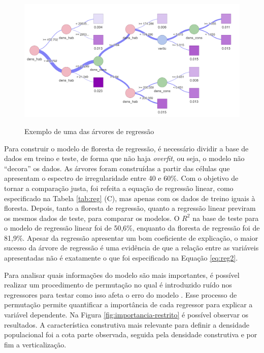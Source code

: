 \begin{figure}[h]
    \centering
    \caption{Exemplo de uma das árvores de regressão}
    \includegraphics[width = \linewidth]{imagens/tree_example.png}
    \label{fig:tree}
\end{figure}

Para construir o modelo de floresta de regressão, é necessário dividir a base de dados em treino e teste, de forma que não haja \textit{overfit}, ou seja, o modelo não ``decora'' os dados. As árvores foram construídas a partir das células que apresentam o espectro de irregularidade entre 40 e 60\%. Com o objetivo de tornar a comparação justa, foi refeita a equação de regressão linear, como especificado na Tabela \ref{tab:reg} (C), mas apenas com os dados de treino iguais à floresta. Depois, tanto a floresta de regressão, quanto a regressão linear previram os mesmos dados de teste, para comparar os modelos. O $R^2$ na base de teste para o modelo de regressão linear foi de 50,6\%, enquanto da floresta de regressão foi de 81,9\%. Apesar da regressão apresentar um bom coeficiente de explicação, o maior sucesso da árvore de regressão é uma evidência de que a relação entre as variáveis apresentadas não é exatamente o que foi especificado na Equação \ref{eq:reg2}.

Para analisar quais informações do modelo são mais importantes, é possível realizar um procedimento de permutação no qual é introduzido ruído nos regressores para testar como isso afeta o erro do modelo \cite{breiman2001random, Nembrini2018}. Esse processo de permutação permite quantificar a importância de cada regressor para explicar a variável dependente. Na Figura \ref{fig:importancia-restrito} é possível observar os resultados. A característica construtiva mais relevante para definir a densidade populacional foi a cota parte observada, seguida pela densidade construtiva e por fim a verticalização.

